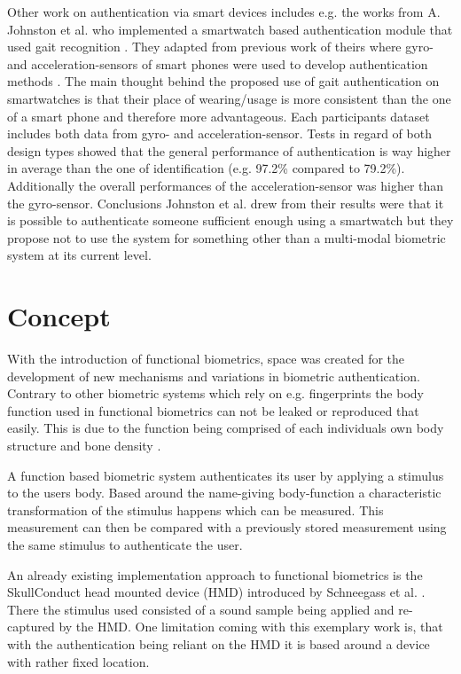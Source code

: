 Other work on authentication via smart devices includes e.g. the works from A. Johnston et al. who implemented a smartwatch based authentication module that used gait recognition \cite{johnston2015smartwatch}.
They adapted from previous work of theirs where gyro- and acceleration-sensors of smart phones were used to develop authentication methods \cite{kwapisz2010cell}.
The main thought behind the proposed use of gait authentication on smartwatches is that their place of wearing/usage is more consistent than the one of a smart phone and therefore more advantageous.
Each participants dataset includes both data from gyro- and acceleration-sensor.
Tests in regard of both design types showed that the general performance of authentication is way higher in average than the one of identification (e.g. 97.2\% compared to 79.2\%).
Additionally the overall performances of the acceleration-sensor was higher than the gyro-sensor.
Conclusions Johnston et al. drew from their results were that it is possible to authenticate someone sufficient enough using a smartwatch but they propose not to use the system for something other than a multi-modal biometric system at its current level. 
\newpage

\section{Concept}
With the introduction of functional biometrics, space was created for the development of new mechanisms and variations in biometric authentication.
Contrary to other biometric systems which rely on e.g. fingerprints the body function used in functional biometrics can not be leaked or reproduced that easily.
This is due to the function being comprised of each individuals own body structure and bone density \cite{schneegass2020functbiometric}.

A function based biometric system authenticates its user by applying a stimulus to the users body.
Based around the name-giving body-function a characteristic transformation of the stimulus happens which can be measured.
This measurement can then be compared with a previously stored measurement using the same stimulus to authenticate the user.

An already existing implementation approach to functional biometrics is the SkullConduct head mounted device (HMD) introduced by Schneegass et al. \cite{SkullConduct}.
There the stimulus used consisted of a sound sample being applied and re-captured by the HMD.
One limitation coming with this exemplary work is, that with the authentication being reliant on the HMD it is based around a device with rather fixed location.

